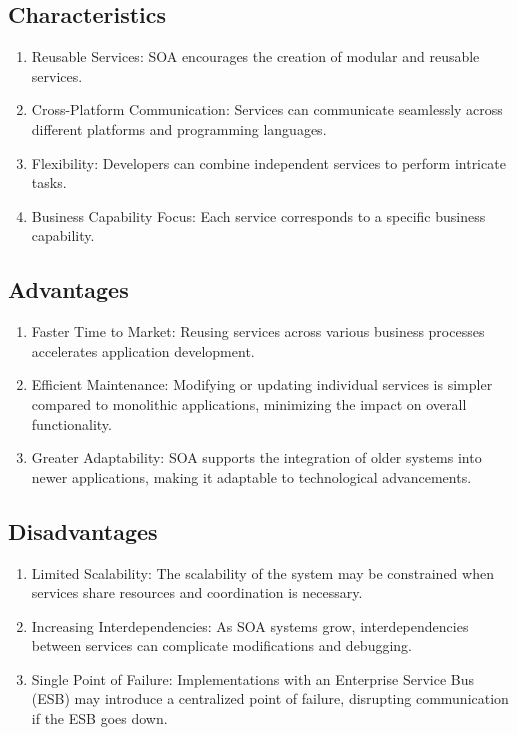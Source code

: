 \documentclass[12pt,a4paper, twosite]{article}
\begin{document}
	\subsection{Characteristics}
	\label{sec:product-functions}
	\begin{enumerate}
		\item Reusable Services: SOA encourages the creation of modular and reusable services.
		\item Cross-Platform Communication: Services can communicate seamlessly across different platforms and programming languages.
		\item Flexibility: Developers can combine independent services to perform intricate tasks.
		\item Business Capability Focus: Each service corresponds to a specific business capability.

	\end{enumerate}
	
\subsection{Advantages}
	\label{sec:user-characteristics}
	\begin{enumerate}
		\item Faster Time to Market: Reusing services across various business processes accelerates application development.
		
		\item Efficient Maintenance: Modifying or updating individual services is simpler compared to monolithic applications, minimizing the impact on overall functionality.
		
		\item Greater Adaptability: SOA supports the integration of older systems into newer applications, making it adaptable to technological advancements.
	\end{enumerate}
	
	\subsection{Disadvantages}
	\label{sec:constraints}
	
	\begin{enumerate}
		\item Limited Scalability: The scalability of the system may be constrained when services share resources and coordination is necessary.
		
		\item Increasing Interdependencies: As SOA systems grow, interdependencies between services can complicate modifications and debugging.
		
		\item Single Point of Failure: Implementations with an Enterprise Service Bus (ESB) may introduce a centralized point of failure, disrupting communication if the ESB goes down.
	\end{enumerate}
	
\end{document}

